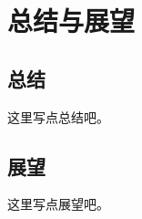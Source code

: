 \chapter{总结与展望}
\section{总结}
\label{sec:summary}
这里写点总结吧。
\section{展望}
\label{sec:prospect}
这里写点展望吧。
